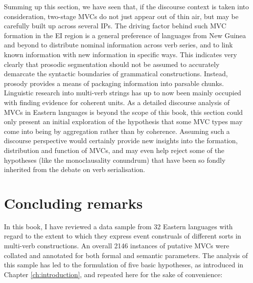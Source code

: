 Summing up this section, we have seen that, if the discourse context is taken into consideration, two-stage MVCs do not just appear out of thin air, but may be carefully built up across several IPs. The driving factor behind such MVC formation in the EI region is a general preference of languages from New Guinea and beyond to distribute nominal information across verb series, and to link known information with new information in specific ways. This indicates very clearly that prosodic segmentation should not be assumed to accurately demarcate the syntactic boundaries of grammatical constructions. Instead, prosody provides a means of packaging information into parsable chunks. Linguistic research into multi-verb strings has up to now been mainly occupied with finding evidence for coherent units. As a detailed discourse analysis of MVCs in Eastern  languages is beyond the scope of this book, this section could only present an initial exploration of the hypothesis that some MVC types may come into being by aggregation rather than by coherence. Assuming such a discourse perspective would certainly provide new insights into the formation, distribution and function of MVCs, and may even help reject some of the hypotheses (like the monoclausality conundrum) that have been so fondly inherited from the debate on verb serialisation.

\section{Concluding remarks} \label{sec:concluding}

In this book, I have reviewed a data sample from 32 Eastern  languages with regard to the extent to which they express event construals of different sorts in multi-verb constructions. An overall 2146 instances of putative MVCs were collated and annotated for both formal and semantic parameters. The analysis of this sample has led to the formulation of five basic hypotheses, as introduced in Chapter \ref{ch:introduction}, and repeated here for the sake of convenience:

